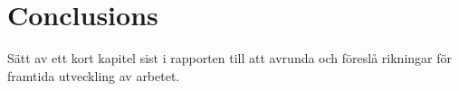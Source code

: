 \chapter{Conclusions}\label{cha:conclusions}
%
Sätt av ett kort kapitel sist i rapporten till att avrunda och föreslå rikningar för framtida utveckling av arbetet.
